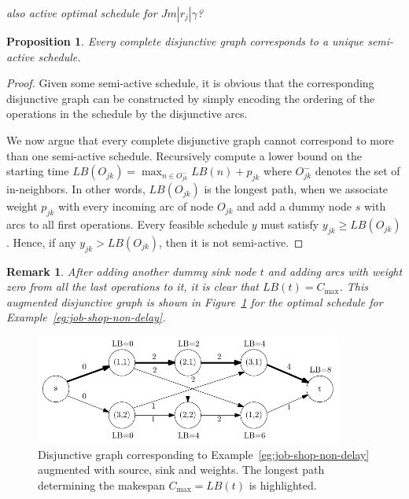 \documentclass{article}
\theoremstyle{definition}
\theoremstyle{plain}
\newtheorem{proposition}{Proposition}[section]
\newtheorem{remark}{Remark}[section]
\begin{document}
\vspace{0.5em}
\noindent
\textit{\color{blue}also active optimal schedule for $Jm | r_j | \gamma$?}

\begin{proposition}
  \label{prop:disjunctive-graph-semi-active}
  Every complete disjunctive graph corresponds to a unique semi-active schedule.
\end{proposition}
\begin{proof}
  Given some semi-active schedule, it is obvious that the corresponding
  disjunctive graph can be constructed by simply encoding the ordering of the
  operations in the schedule by the disjunctive arcs.

  We now argue that every complete disjunctive graph cannot correspond to more than
  one semi-active schedule.
  Recursively compute a lower bound on the starting time
  $LB(O_{jk}) = \max_{n \in O_{jk}^{-}} LB(n) + p_{jk}$ where $O_{jk}^{-}$ denotes
  the set of in-neighbors. In other words, $LB(O_{jk})$ is the longest path, when
  we associate weight $p_{jk}$ with every incoming arc of node $O_{jk}$ and add a
  dummy node $s$ with arcs to all first operations. Every feasible schedule $y$
  must satisfy $y_{jk} \geq LB(O_{jk})$. Hence, if any $y_{jk} > LB(O_{jk})$, then
  it is not semi-active.
\end{proof}

\begin{remark}
  After adding another dummy \textit{sink} node $t$ and adding arcs with weight
  zero from all the last operations to it, it is clear that
  $LB(t) = C_\text{max}$. This augmented disjunctive graph is shown in
  Figure~\ref{fig:augmented-graph} for the optimal schedule for
  Example~\ref{eg:job-shop-non-delay}.
\end{remark}

\begin{figure}
  \centering
  \includegraphics[width=0.9\textwidth]{figures/disjunctive-graph-source-sink.pdf}
  \caption{Disjunctive graph corresponding to
    Example~\ref{eg:job-shop-non-delay} augmented with source, sink and weights.
    The longest path determining the makespan $C_{\text{max}} = LB(t)$ is
    highlighted.}
  \label{fig:augmented-graph}
\end{figure}
\end{document}
